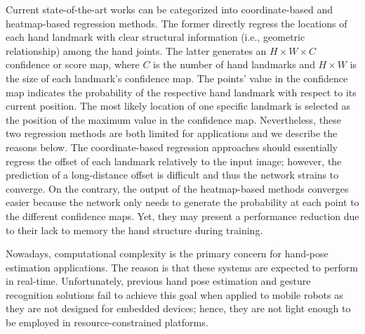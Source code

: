 \documentclass[11pt]{article}
\begin{document}
Current state-of-the-art works can be categorized into coordinate-based \cite{ref2,ref9,ref25,ref26,ref27} and heatmap-based \cite{ref1,ref28,ref29,ref30,ref31} regression methods. The former directly regress the locations of each hand landmark with clear structural information (i.e., geometric relationship) among the hand joints. The latter generates an $H \times W \times C$ confidence or score map, where $C$ is the number of hand landmarks and $H \times W$ is the size of each landmark’s confidence map. The points’ value in the confidence map indicates the probability of the respective hand landmark with respect to its current position. The most likely location of one specific landmark is selected as the position of the maximum value in the confidence map. Nevertheless, these two regression methods are both limited for applications and we describe the reasons below. The coordinate-based regression approaches should essentially regress the offset of each landmark relatively to the input image; however, the prediction of a long-distance offset is difficult and thus the network strains to converge. On the contrary, the output of the heatmap-based methods converges easier because the network only needs to generate the probability at each point to the different confidence maps. Yet, they may present a performance reduction due to their lack to memory the hand structure during training.

Nowadays, computational complexity is the primary concern for hand-pose estimation applications. The reason is that these systems are expected to perform in real-time. Unfortunately, previous hand pose estimation and gesture recognition solutions fail to achieve this goal when applied to mobile robots \cite{ref29,ref30,ref32,ref33,ref34,ref35} as they are not designed for embedded devices; hence, they are not light enough to be employed in resource-constrained platforms.
\end{document}

